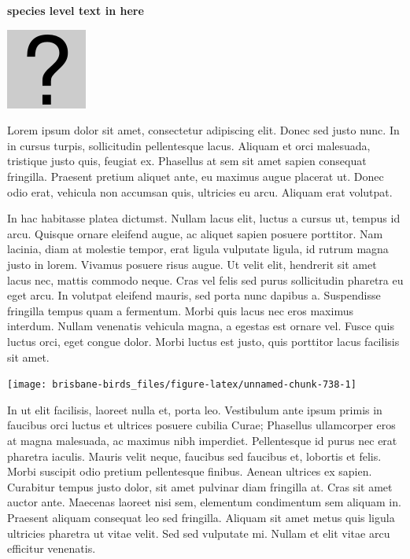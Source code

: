 \documentclass[]{book}
\let\origfigure\figure
\let\endorigfigure\endfigure
\renewenvironment{figure}[1][2] {
  \expandafter\origfigure\expandafter[H]
} {
  \endorigfigure
}
\begin{document}
\textbf{species level text in here}

\begin{figure}
\centering
\includegraphics{assets/missing.png}
\caption{No image for species}
\end{figure}

Lorem ipsum dolor sit amet, consectetur adipiscing elit. Donec sed justo
nunc. In in cursus turpis, sollicitudin pellentesque lacus. Aliquam et
orci malesuada, tristique justo quis, feugiat ex. Phasellus at sem sit
amet sapien consequat fringilla. Praesent pretium aliquet ante, eu
maximus augue placerat ut. Donec odio erat, vehicula non accumsan quis,
ultricies eu arcu. Aliquam erat volutpat.

In hac habitasse platea dictumst. Nullam lacus elit, luctus a cursus ut,
tempus id arcu. Quisque ornare eleifend augue, ac aliquet sapien posuere
porttitor. Nam lacinia, diam at molestie tempor, erat ligula vulputate
ligula, id rutrum magna justo in lorem. Vivamus posuere risus augue. Ut
velit elit, hendrerit sit amet lacus nec, mattis commodo neque. Cras vel
felis sed purus sollicitudin pharetra eu eget arcu. In volutpat eleifend
mauris, sed porta nunc dapibus a. Suspendisse fringilla tempus quam a
fermentum. Morbi quis lacus nec eros maximus interdum. Nullam venenatis
vehicula magna, a egestas est ornare vel. Fusce quis luctus orci, eget
congue dolor. Morbi luctus est justo, quis porttitor lacus facilisis sit
amet.

\begin{figure}
\texttt{[image: brisbane-birds\_files/figure-latex/unnamed-chunk-738-1]} \caption{insert figure caption}\label{fig:unnamed-chunk-738}
\end{figure}

In ut elit facilisis, laoreet nulla et, porta leo. Vestibulum ante ipsum
primis in faucibus orci luctus et ultrices posuere cubilia Curae;
Phasellus ullamcorper eros at magna malesuada, ac maximus nibh
imperdiet. Pellentesque id purus nec erat pharetra iaculis. Mauris velit
neque, faucibus sed faucibus et, lobortis et felis. Morbi suscipit odio
pretium pellentesque finibus. Aenean ultrices ex sapien. Curabitur
tempus justo dolor, sit amet pulvinar diam fringilla at. Cras sit amet
auctor ante. Maecenas laoreet nisi sem, elementum condimentum sem
aliquam in. Praesent aliquam consequat leo sed fringilla. Aliquam sit
amet metus quis ligula ultricies pharetra ut vitae velit. Sed sed
vulputate mi. Nullam et elit vitae arcu efficitur venenatis.
\end{document}
